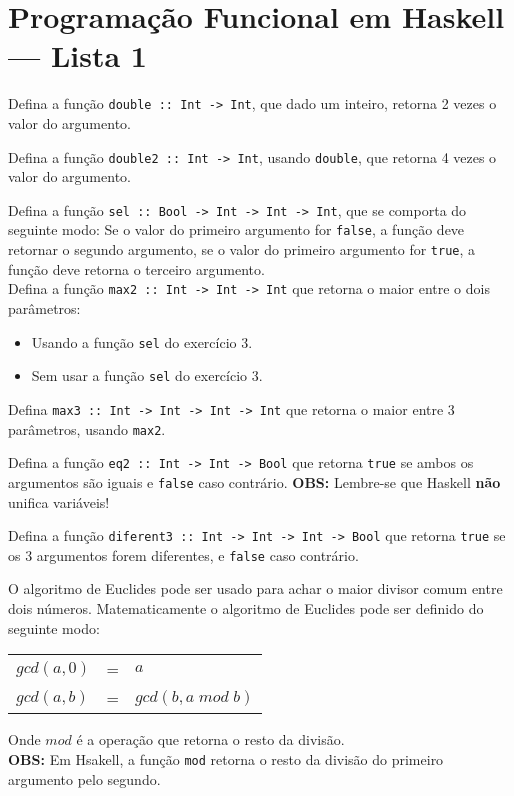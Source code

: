 \documentclass[a4paper,11pt]{exam}
\begin{document}
\topmargin=0pt

\section{Programação Funcional em Haskell --- Lista 1}
\begin{questions}

  \question Defina a função \texttt{double :: Int ->  Int}, que dado um inteiro, 
  retorna 2 vezes o valor do argumento.
  
  \question Defina a função  \texttt{double2 :: Int -> Int}, usando \texttt{double}, que
  retorna 4 vezes o valor do argumento.
  
  \question Defina a função \texttt{sel :: Bool -> Int -> Int -> Int}, que se comporta do
   seguinte modo: Se o valor do primeiro argumento for \texttt{false}, a função deve retornar o segundo 
   argumento, se o valor do primeiro argumento for \texttt{true}, a função deve retorna o terceiro argumento.\\

  \question Defina a função \texttt{max2 :: Int -> Int -> Int} que retorna o maior entre o dois parâmetros: 
   \begin{itemize}
      \item Usando a função \texttt{sel} do exercício 3.
      \item Sem usar a função \texttt{sel} do exercício 3. 
   \end{itemize}
   
  \question Defina \texttt{max3 :: Int -> Int -> Int -> Int} que retorna o maior entre 3 parâmetros, usando
  \texttt{max2}.

  \question Defina a função \texttt{eq2 :: Int -> Int -> Bool} que retorna \texttt{true} se ambos os argumentos
   são iguais e \texttt{false} caso contrário. \textbf{OBS:} Lembre-se que Haskell \textbf{não} unifica variáveis!

  \question Defina a função  \texttt{diferent3 :: Int -> Int -> Int -> Bool} que retorna \texttt{true} se os 3 argumentos
   forem diferentes, e \texttt{false} caso contrário. 
    
 
  \question  O algoritmo de Euclides pode ser usado para achar o maior divisor comum entre dois números.
  Matematicamente o algoritmo de Euclides pode ser definido do seguinte modo: 
   \begin{center} 
      \begin{tabular}{lcl}
         $gcd(a,0)$ & = & $a$ \\
         $gcd(a,b)$ & = & $gcd(b,a \;mod\; b)$\\
      \end{tabular}
   \end{center}
   Onde $mod$ é a operação que retorna o resto da divisão.\\ 
   \textbf{OBS:} Em Hsakell,  a função \texttt{mod} retorna o resto da divisão do primeiro
   argumento pelo segundo.
   \begin{parts}

\end{parts}
\end{questions}
\end{document}
